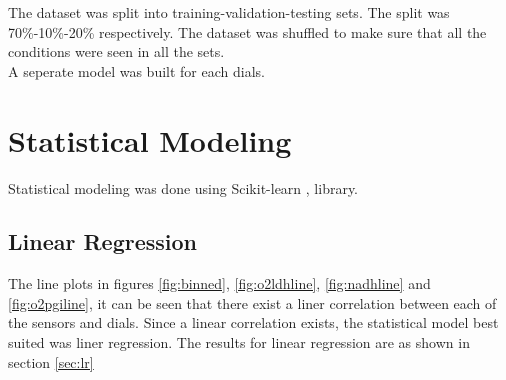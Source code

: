 \documentclass[12pt,chapterheads]{ucsd}
\begin{document}
The dataset was split into training-validation-testing sets. The split was 70\%-10\%-20\% respectively. The dataset was shuffled to make sure that all the conditions were seen in all the sets. \\
A seperate model was built for each dials. 

\section{Statistical Modeling}
    Statistical modeling was done using Scikit-learn \cite{scikit-learn}, \cite{sklearn_api} library.
\subsection{Linear Regression}
The line plots in figures \ref{fig:binned}, \ref{fig:o2ldhline}, \ref{fig:nadhline} and \ref{fig:o2pgiline}, it can be seen that there exist a liner correlation between each of the sensors and dials. Since a linear correlation exists, the statistical model best suited was liner regression. The results for linear regression are as shown in section \ref{sec:lr}
\end{document}

